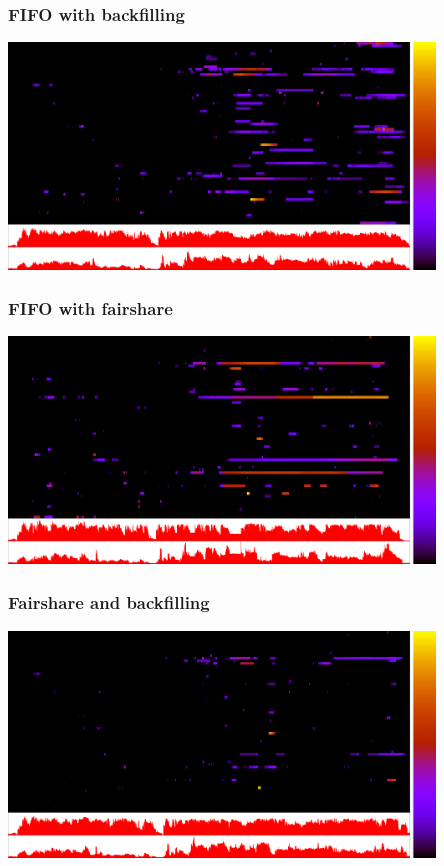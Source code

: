\begin{frame}
	\frametitle{FIFO with backfilling}
	\begin{center}
	\includegraphics[width=0.85\textwidth]{none_backfill.png}
	\end{center}
\end{frame}

\begin{frame}
	\frametitle{FIFO with fairshare}
	\begin{center}
	\includegraphics[width=0.85\textwidth]{max_fifo.png}
	\end{center}
\end{frame}

\begin{frame}
	\frametitle{Fairshare and backfilling}
	\begin{center}
	\includegraphics[width=0.85\textwidth]{max_backfill.png}
	\end{center}
\end{frame}

